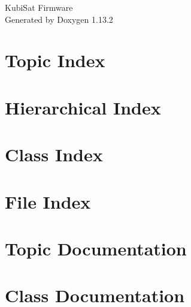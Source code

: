 \documentclass[twoside]{book}
\newcommand{\+}{\discretionary{\mbox{\scriptsize$\hookleftarrow$}}{}{}}
\newcommand{\clearemptydoublepage}{%
    \newpage{\pagestyle{empty}\cleardoublepage}%
  }
\begin{document}
  \raggedbottom
    \hypersetup{pageanchor=false,
                bookmarksnumbered=true,
                pdfencoding=unicode
               }
  \begin{titlepage}
  \vspace*{7cm}
  \begin{center}%
  {\Large Kubi\+Sat Firmware}\\
  \vspace*{1cm}
  {\large Generated by Doxygen 1.13.2}\\
  \end{center}
  \end{titlepage}
  \clearemptydoublepage
  \tableofcontents
  \clearemptydoublepage
  \hypersetup{pageanchor=true}

\chapter{Topic Index}

\chapter{Hierarchical Index}

\chapter{Class Index}

\chapter{File Index}

\chapter{Topic Documentation}




\chapter{Class Documentation}

























\end{document}
